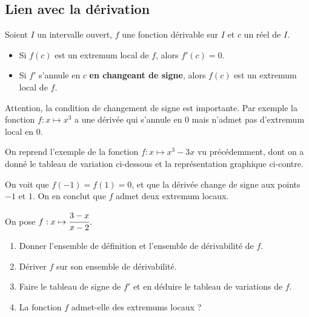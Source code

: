 \documentclass[11pt]{article}
\begin{document}
\subsection{Lien avec la dérivation}
\begin{propadm}
  Soient $I$ un intervalle ouvert, $f$ une fonction dérivable sur $I$ et $c$
  un réel de $I$.
  \begin{itemize}
    \item Si $f(c)$ est un extremum local de $f$, alors $f'(c)=0$.
    \item Si $f'$ s'annule en $c$ \textbf{en changeant de signe}, alors $f(c)$
      est un extremum local de $f$.
  \end{itemize}
\end{propadm}
\begin{rmq}
  Attention, la condition de changement de signe est importante. Par exemple la
  fonction $f:x\mapsto x^3$ a une dérivée qui s'annule en $0$ mais n'admet pas
  d'extremum local en $0$.
\end{rmq}
\begin{exemple}
  \begin{minipage}{.6\textwidth}
    On reprend l'exemple de la fonction $f:x\mapsto x^3-3x$ vu précédemment,
    dont on a donné le tableau de variation ci-dessous et la représentation
    graphique ci-contre.
  \begin{center}
  \end{center}
On voit que $f(-1)=f(1)=0$, et que la dérivée change de signe aux points $-1$ et
$1$. On en conclut que $f$ admet deux extremum locaux.
\end{minipage}
\begin{minipage}{.4\textwidth}
  \begin{center}
  \end{center}
\end{minipage}
\end{exemple}

\begin{app}
  On pose $f:x\mapsto\cfrac{3-x}{x-2}$.
  \begin{enumerate}
    \item Donner l'ensemble de définition et l'ensemble de dérivabilité de $f$.
    \item Dériver $f$ sur son ensemble de dérivabilité.
    \item Faire le tableau de signe de $f'$ et en déduire le tableau de
      variations de $f$.
    \item La fonction $f$ admet-elle des extremums locaux ?
  \end{enumerate}
\end{app}
\end{document}
